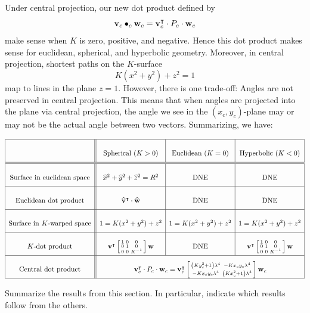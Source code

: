 \documentclass[newpage,hints,handout]{ximera}
\begin{document}
Under central projection, our new dot product defined by
\[
\mathbf{v}_c \bullet_c \mathbf{w}_c = \mathbf{v}_c^\intercal \cdot P_c \cdot \mathbf{w}_c
\]
make sense when $K$ is zero, positive, and negative. Hence this dot
product makes sense for euclidean, spherical, and hyperbolic
geometry. Moreover, in central projection, shortest paths on the $K$-surface
\[
K(x^2 + y^2) + z^2 = 1
\]
map to lines in the plane $z=1$. However, there is one trade-off:
Angles are not preserved in central projection. This means that when
angles are projected into the plane via central projection, the angle
we see in the $(x_c,y_c)$-plane may or may not be the actual angle
between two vectors. Summarizing, we have:


\[
  {\renewcommand{\arraystretch}{2.7}
  \begin{array}{|c||c|c|c|}\hline
    & \text{Spherical (}K>0) & \text{Euclidean (}K=0) & \text{Hyperbolic (}K<0)\\
    \hline\hline
    \text{Surface in euclidean space}
    & \hat{x}^{2}+\hat{y}^{2}+\hat{z}^{2}=R^{2} & \text{DNE}  & \text{DNE} \\\hline
    \text{Euclidean dot product} & \hat{\mathbf v}^\transpose\cdot \hat{\mathbf w}
                             & \text{DNE}  & \text{DNE}\\\hline
    \text{Surface in $K$-warped space}
    & {1=K(x^{2}+y^{2})+z^{2}} & 1=K(x^{2}+y^{2})+z^{2} & 1=K(x^{2}+y^{2})+z^{2}\\\hline
    K\text{-dot product}
    & \mathbf v^\transpose \left[\begin{smallmatrix}
        1 & 0 & 0\\
        0 & 1 & 0\\
        0 & 0 & K^{-1}
      \end{smallmatrix}\right] \mathbf w &  \text{DNE}
    & \mathbf{v}^\transpose \left[\begin{smallmatrix}1 & 0 & 0\\ 0 & 1 & 0\\ 0 & 0 & K^{-1}\end{smallmatrix}\right]\mathbf w \\\hline
    \text{Central dot product} & \multicolumn{3}{c|}{
        \mathbf{v}_c^\transpose \cdot P_c \cdot \mathbf{w}_c
        = \mathbf{v}_c^\transpose\left[\begin{smallmatrix}
            \left(Ky_c^2+1\right)\lambda^4 & -Kx_{c}y_{c}\lambda^4 \\
            -Kx_{c}y_{c}\lambda^4 & \left(Kx_c^2+1\right)\lambda^4
          \end{smallmatrix}\right] \mathbf{w}_c}\\\hline
\end{array}}
\]




\begin{problem}
Summarize the results from this section. In particular, indicate which
results follow from the others.
\begin{freeResponse}
\end{freeResponse}
\end{problem}
\end{document}
